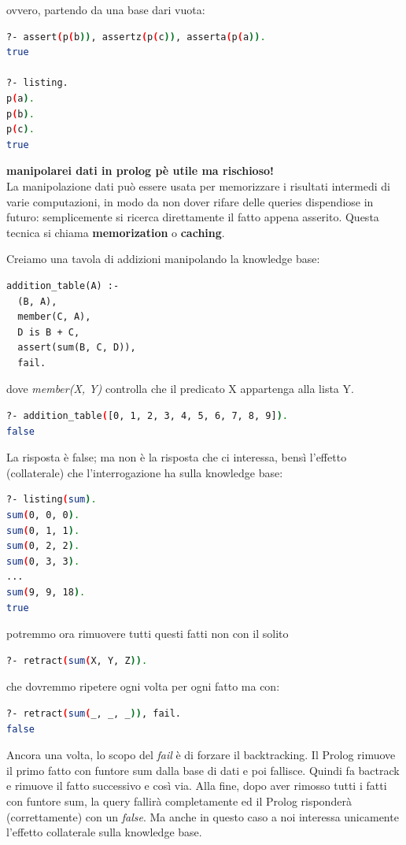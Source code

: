 \documentclass[a4paper,12pt, oneside]{book}
\begin{document}
ovvero, partendo da una base dari vuota:
\begin{shaded}
	\begin{lstlisting}[language=bash]
?- assert(p(b)), assertz(p(c)), asserta(p(a)).
true

?- listing.
p(a).
p(b).
p(c).
true
\end{lstlisting}
\end{shaded}
\textbf{manipolarei dati in prolog pè utile ma rischioso!}\\
La manipolazione dati può essere usata per memorizzare i risultati
intermedi di varie computazioni, in modo da non dover rifare
delle queries dispendiose in futuro: semplicemente si ricerca
direttamente il fatto appena asserito. Questa tecnica si chiama \textbf{memorization} o \textbf{caching}.
\begin{esempio}
	Creiamo una tavola di addizioni manipolando la knowledge base:
	\begin{verbatim}
addition_table(A) :-
  (B, A),
  member(C, A),
  D is B + C,
  assert(sum(B, C, D)),
  fail.
\end{verbatim}
	dove \textit{member(X, Y)} controlla che il predicato X appartenga alla lista Y.\\
	\begin{shaded}
		\begin{lstlisting}[language=bash]
?- addition_table([0, 1, 2, 3, 4, 5, 6, 7, 8, 9]).
false
\end{lstlisting}
	\end{shaded}
	La risposta è false; ma non è la risposta che ci interessa, bensì
	l'effetto (collaterale) che l'interrogazione ha sulla knowledge base:
	\begin{shaded}
		\begin{lstlisting}[language=bash]
?- listing(sum).
sum(0, 0, 0).
sum(0, 1, 1).
sum(0, 2, 2).
sum(0, 3, 3).
...
sum(9, 9, 18).
true
\end{lstlisting}
	\end{shaded}
	potremmo ora rimuovere tutti questi fatti non con il solito
	\begin{shaded}
		\begin{lstlisting}[language=bash]
?- retract(sum(X, Y, Z)).
\end{lstlisting}
	\end{shaded}
	che dovremmo ripetere ogni volta per ogni fatto ma con:
	\begin{shaded}
		\begin{lstlisting}[language=bash]
?- retract(sum(_, _, _)), fail.
false
\end{lstlisting}
	\end{shaded}
	Ancora una volta, lo scopo del \textit{fail} è di forzare il backtracking. Il Prolog rimuove il primo fatto con funtore sum dalla base di dati e poi fallisce. Quindi fa bactrack e rimuove il fatto successivo e così via. Alla fine, dopo aver rimosso tutti i fatti con funtore sum, la query fallirà completamente ed il Prolog risponderà (correttamente) con un \textit{false}. Ma anche in questo caso a noi interessa unicamente l'effetto collaterale sulla knowledge base.
\end{esempio}
\end{document}
